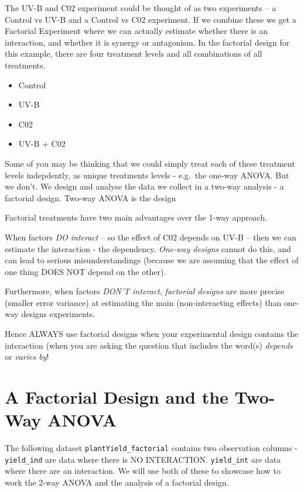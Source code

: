 \documentclass[
]{book}
\providecommand{\tightlist}{%
  \setlength{\itemsep}{0pt}\setlength{\parskip}{0pt}}
\begin{document}
The UV-B and C02 experiment could be thought of as two experiments -- a Control vs UV-B and a Control vs C02 experiment. If we combine these we get a Factorial Experiment where we can actually estimate whether there is an interaction, and whether it is synergy or antagonism. In the factorial design for this example, there are four treatment levels and all combinations of all treatments.

\begin{itemize}
\tightlist
\item
  Control
\item
  UV-B
\item
  C02
\item
  UV-B + C02
\end{itemize}

Some of you may be thinking that we could simply treat each of these treatment levels indepdently, as unique treatments levels - e.g.~the one-way ANOVA. But we don't. We design and analyse the data we collect in a two-way analysis - a factorial design. Two-way ANOVA is the design

Factorial treatments have two main advantages over the 1-way approach.

When factors \emph{DO interact} -- so the effect of C02 depends on UV-B -- then we can estimate the interaction - the dependency. \emph{One-way designs} cannot do this, and can lead to serious misunderstandings (because we are assuming that the effect of one thing DOES NOT depend on the other).

Furthermore, when factors \emph{DON'T interact}, \emph{factorial designs} are more precise (smaller error variance) at estimating the main (non-interacting effects) than one-way designs experiments.

Hence ALWAYS use factorial designs when your experimental design contains the interaction (when you are asking the question that includes the word(s) \emph{depends} or \emph{varies by}!

\hypertarget{a-factorial-design-and-the-two-way-anova}{%
\section{A Factorial Design and the Two-Way ANOVA}\label{a-factorial-design-and-the-two-way-anova}}

The following dataset \texttt{plantYield\_factorial} contains two observation columns - \texttt{yield\_ind} are data where there is NO INTERACTION. \texttt{yield\_int} are data where there are an interaction. We will use both of these to showcase how to work the 2-way ANOVA and the analysis of a factorial design.
\end{document}
